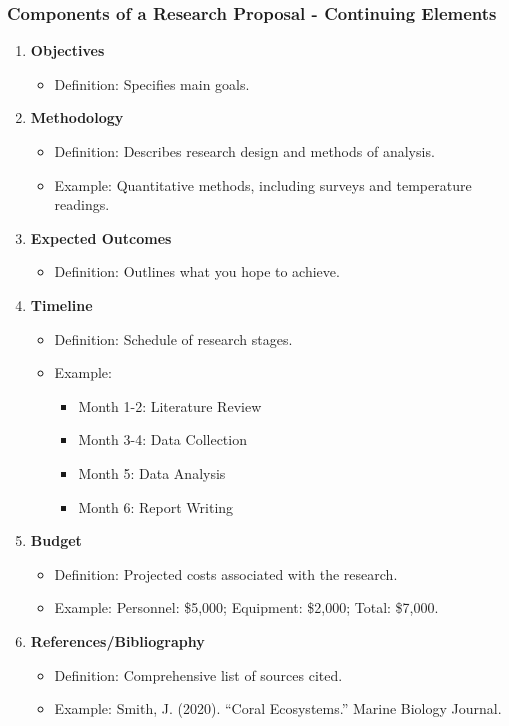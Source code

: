 \documentclass[aspectratio=169]{beamer}
\begin{document}
\begin{frame}[fragile]
    \frametitle{Components of a Research Proposal - Continuing Elements}
    \begin{enumerate}[resume]
        \item \textbf{Objectives}
            \begin{itemize}
                \item Definition: Specifies main goals.
            \end{itemize}
        \item \textbf{Methodology}
            \begin{itemize}
                \item Definition: Describes research design and methods of analysis.
                \item Example: Quantitative methods, including surveys and temperature readings.
            \end{itemize}
        \item \textbf{Expected Outcomes}
            \begin{itemize}
                \item Definition: Outlines what you hope to achieve.
            \end{itemize}
        \item \textbf{Timeline}
            \begin{itemize}
                \item Definition: Schedule of research stages.
                \item Example:
                    \begin{itemize}
                        \item Month 1-2: Literature Review
                        \item Month 3-4: Data Collection
                        \item Month 5: Data Analysis
                        \item Month 6: Report Writing
                    \end{itemize}
            \end{itemize}
        \item \textbf{Budget}
            \begin{itemize}
                \item Definition: Projected costs associated with the research.
                \item Example: Personnel: \$5,000; Equipment: \$2,000; Total: \$7,000.
            \end{itemize}
        \item \textbf{References/Bibliography}
            \begin{itemize}
                \item Definition: Comprehensive list of sources cited.
                \item Example: Smith, J. (2020). ``Coral Ecosystems.'' Marine Biology Journal.
            \end{itemize}
    \end{enumerate}
\end{frame}
\end{document}
